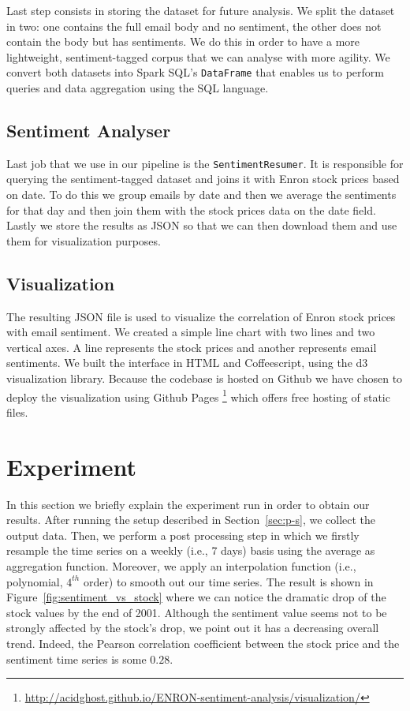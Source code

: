 \documentclass{vldb}
\begin{document}
Last step consists in storing the dataset for future analysis. We split the
dataset in two: one contains the full email body and no sentiment, the other
does not contain the body but has sentiments. We do this in order to have a more
lightweight, sentiment-tagged corpus that we can analyse with more agility. We
convert both datasets into Spark SQL's \texttt{DataFrame} that enables us to
perform queries and data aggregation using the SQL language.

\subsection{Sentiment Analyser}
\label{sub-sec:sentiment-analyser}
Last job that we use in our pipeline is the \texttt{SentimentResumer}. It is
responsible for querying the sentiment-tagged dataset and joins it with Enron
stock prices based on date. To do this we group emails by date and then we
average the sentiments for that day and then join them with the stock prices
data on the date field. Lastly we store the results as JSON so that we can
then download them and use them for visualization purposes.

\subsection{Visualization}
\label{sub-sec:visualization}
The resulting JSON file is used to visualize the correlation of Enron stock
prices with email sentiment. We created a simple line chart with two lines and
two vertical axes. A line represents the stock prices and another represents
email sentiments. We built the interface in HTML and Coffeescript, using the d3
visualization library. Because the codebase is hosted on Github we have chosen
to deploy the visualization using Github Pages
\footnote{\url{http://acidghost.github.io/ENRON-sentiment-analysis/visualization/}}
which offers free hosting of static files.

\section{Experiment}
\label{sec:exp}
In this section we briefly explain the experiment run in order to obtain our results.
After running the setup described in Section~\ref{sec:p-s}, we collect the output data.
Then, we perform a post processing step in which we firstly resample the time series on a weekly (i.e., 7 days) basis using the average as aggregation function.
Moreover, we apply an interpolation function (i.e., polynomial, $4^{th}$ order) to smooth out our time series.
The result is shown in Figure~\ref{fig:sentiment_vs_stock} where we can notice the dramatic drop of the stock values by the end of 2001.
Although the sentiment value seems not to be strongly affected by the stock's drop, we point out it has a decreasing overall trend.
Indeed, the Pearson correlation  coefficient between the stock price and the sentiment time series is some $0.28$.
\end{document}
